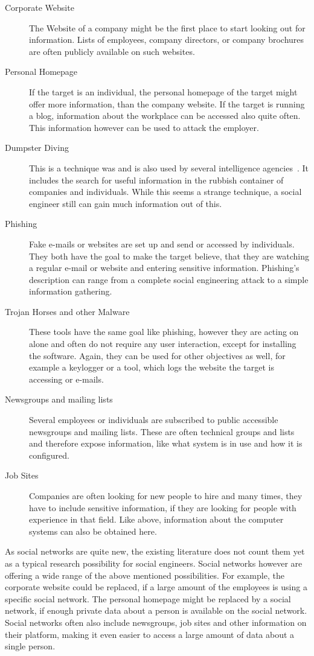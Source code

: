 \begin{description}

\item[Corporate Website] The Website of a company might be the first place to
  start looking out for information. Lists of employees,
  company directors, or company brochures are often publicly available on such websites. 
\item[Personal Homepage] If the target is an individual, the personal homepage
  of the target might offer more information, than the company website. If the
  target is running a blog, information about the workplace can be accessed
  also quite often. This information however can be used to attack the
  employer.
\item[Dumpster Diving] This is a technique was and is also used by several
  intelligence agencies~\cite{lively2003}. It includes the search
  for useful information in the rubbish container of companies and individuals. While
  this seems a strange technique, a social engineer still can gain much
  information out of this.
\item[Phishing] Fake e-mails or websites are set up and send or accessed by
  individuals. They both have the goal to make the target believe, that they are
  watching a regular e-mail or website and entering sensitive information.
  Phishing's description can range from a complete social engineering attack to
  a simple information gathering.
\item[Trojan Horses and other Malware] These tools have the same goal like
  phishing, however they are acting on alone and often do not require any
  user interaction, except for installing the software. Again, they can
  be used for other objectives as well, for example a keylogger or a tool,
  which logs the website the target is accessing or e-mails.
\item[Newsgroups and mailing lists] Several employees or individuals are
  subscribed to public accessible newsgroups and mailing lists. These are often
  technical groups and lists and therefore expose information, like what system
  is in use and how it is configured.
\item[Job Sites] Companies are often looking for new people to hire and many
  times, they have to include sensitive information, if they are looking for
  people with experience in that field. Like above, information about the
  computer systems can also be obtained here.
\end{description}

As social networks are quite new, the existing literature does not count them
yet as a typical research possibility for social engineers. Social networks
however are offering a wide range of the above mentioned possibilities. For
example, the corporate website could be replaced, if a large amount of the
employees is using a specific social network. The personal homepage might be
replaced by a social network, if enough private data about a person is
available on the social network. Social networks often also include newsgroups,
job sites and other information on their platform, making it even easier to
access a large amount of data about a single person.


